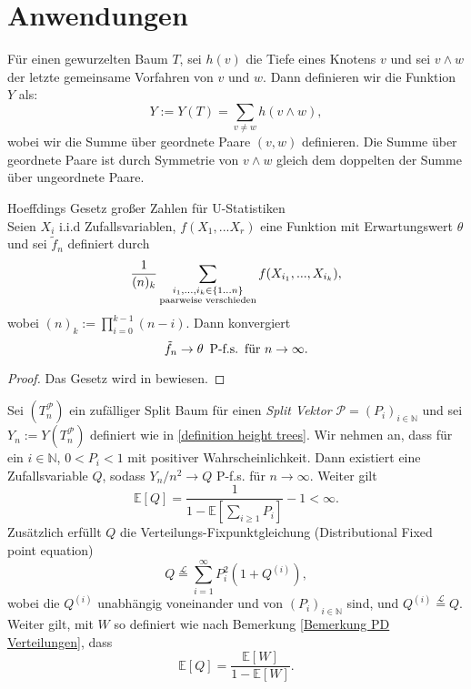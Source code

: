 \chapter{Anwendungen}
\begin{Definition}
    \label{definition height trees}
    Für einen gewurzelten Baum $T$, sei $h(v)$ die Tiefe eines Knotens $v$ und sei $v\wedge w$ der letzte gemeinsame Vorfahren von $v$ und $w$. Dann definieren wir die Funktion $Y$ als:
    \[
        Y := Y(T) = \sum_{v \neq w}h(v \wedge w),
    \]
    wobei wir die Summe über geordnete Paare $(v,w)$ definieren. Die Summe über geordnete Paare ist durch Symmetrie von $v \wedge w$ gleich dem doppelten der Summe über ungeordnete Paare. 
\end{Definition}
\begin{theorem}\textnormal{Hoeffdings Gesetz großer Zahlen für U-Statistiken}\\
    \label{hoeffding theorem}
    Seien $X_i$ i.i.d Zufallsvariablen, $f(X_1,...X_r)$ eine Funktion mit Erwartungswert $\theta$ und sei $\tilde{f}_n$ definiert durch 
    \[
        \frac{1}{(n)_{k}}\sum_{\substack{i_1,...,i_k \in \{1...n\}\\ \textnormal{paarweise verschieden}}}f(X_{i_1},...,X_{i_k}),
    \]
    wobei $(n)_k := \prod_{i=0}^{k-1}(n-i)$.
    Dann konvergiert 
    \[
        \tilde{f}_n  \rightarrow \theta \hspace{5pt} \textnormal{P-f.s.} \hspace{5pt} \textnormal{für } n \rightarrow \infty.
    \]
\begin{proof}
    Das Gesetz wird in \cite{hoeffding1961strong} bewiesen.
\end{proof}
\end{theorem}
\begin{theorem}
    Sei $(T_n^\mathcal{P})$ ein zufälliger Split Baum für einen \textit{Split Vektor} $\mathcal{P} = (P_i)_{i \in \mathbb{N}}$ und sei $Y_n := Y(T^\mathcal{P}_n)$ definiert wie in \ref{definition height trees}. Wir nehmen an, dass für ein $i \in \mathbb{N}$, $0< P_i < 1$ mit positiver Wahrscheinlichkeit. Dann existiert eine Zufallsvariable $Q$, sodass $Y_n/n^2 \rightarrow Q$ P-f.s. für $n \to \infty$. Weiter gilt 
    \begin{equation}
        \label{first equation of Q theorem}
    \mathbb{E}[Q]  = \frac{1}{1-\mathbb{E}[\sum_{i \geq 1}P_i ]}-1 < \infty. 
    \end{equation} 
    Zusätzlich erfüllt $Q$ die Verteilungs-Fixpunktgleichung (Distributional Fixed point equation)
    \begin{equation}
        Q \stackrel{\mathcal{L}}{=} \sum_{i=1}^{\infty}P_i^2(1+Q^{(i)}),
        \label{second equation of Q theorem}
    \end{equation} 
    wobei die $Q^{(i)}$ unabhängig voneinander und von $(P_i)_{i \in \mathbb{N}}$ sind, und $Q^{(i)} \stackrel{\mathcal{L}}{=}Q$. 
    Weiter gilt, mit $W$ so definiert wie nach Bemerkung \ref{Bemerkung PD Verteilungen}, dass 
\begin{equation}
    \mathbb{E}[Q] = \frac{\mathbb{E}[W]}{1 - \mathbb{E}[W]}.
        \label{third equation of Q theorem}
\end{equation}
\end{theorem}
